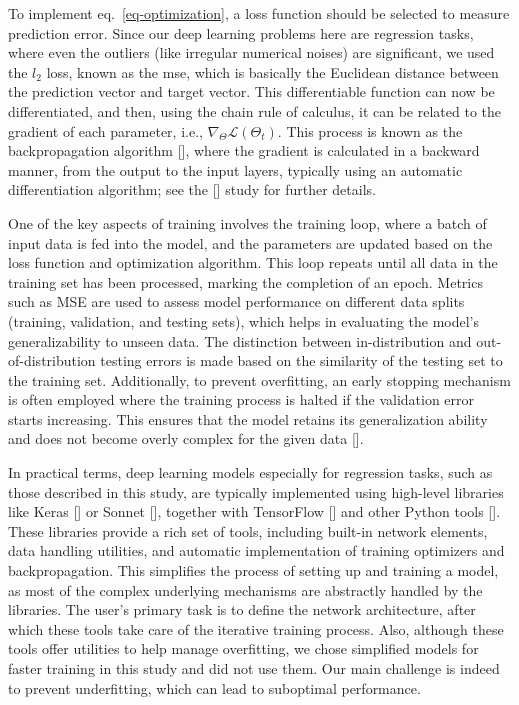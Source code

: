 \documentclass[12pt,a4paper]{report}
\begin{document}
To implement eq.~\ref{eq-optimization}, a loss function should be selected to measure prediction error. Since our deep learning problems here are regression tasks, where even the outliers (like irregular numerical noises) are significant, we used the \(l_2\) loss, known as the \ac{mse}, which is basically the Euclidean distance between the prediction vector and target vector. This differentiable function can now be differentiated, and then, using the chain rule of calculus, it can be related to the gradient of each parameter, i.e., \(\nabla_{\Theta} \mathcal{L}(\Theta_t)\). This process is known as the backpropagation algorithm [\cite{rumelhart1986}], where the gradient is calculated in a backward manner, from the output to the input layers, typically using an automatic differentiation algorithm; see the [\cite{baydin2018}] study for further details.

One of the key aspects of training involves the training loop, where a batch of input data is fed into the model, and the parameters are updated based on the loss function and optimization algorithm. This loop repeats until all data in the training set has been processed, marking the completion of an epoch. Metrics such as MSE are used to assess model performance on different data splits (training, validation, and testing sets), which helps in evaluating the model's generalizability to unseen data. The distinction between in-distribution and out-of-distribution testing errors is made based on the similarity of the testing set to the training set. Additionally, to prevent overfitting, an early stopping mechanism is often employed where the training process is halted if the validation error starts increasing. This ensures that the model retains its generalization ability and does not become overly complex for the given data [\cite{mlbook}].

In practical terms, deep learning models especially for regression tasks, such as those described in this study, are typically implemented using high-level libraries like Keras [\cite{chollet2015}] or Sonnet [\cite{reynolds2017}], together with TensorFlow [\cite{abadi2015}] and other Python tools [\cite{hunter2007,pedregosa2011,kluyver2016,harris2020,virtanen2020}]. These libraries provide a rich set of tools, including built-in network elements, data handling utilities, and automatic implementation of training optimizers and backpropagation. This simplifies the process of setting up and training a model, as most of the complex underlying mechanisms are abstractly handled by the libraries. The user's primary task is to define the network architecture, after which these tools take care of the iterative training process. Also, although these tools offer utilities to help manage overfitting, we chose simplified models for faster training in this study and did not use them. Our main challenge is indeed to prevent underfitting, which can lead to suboptimal performance.
\end{document}
